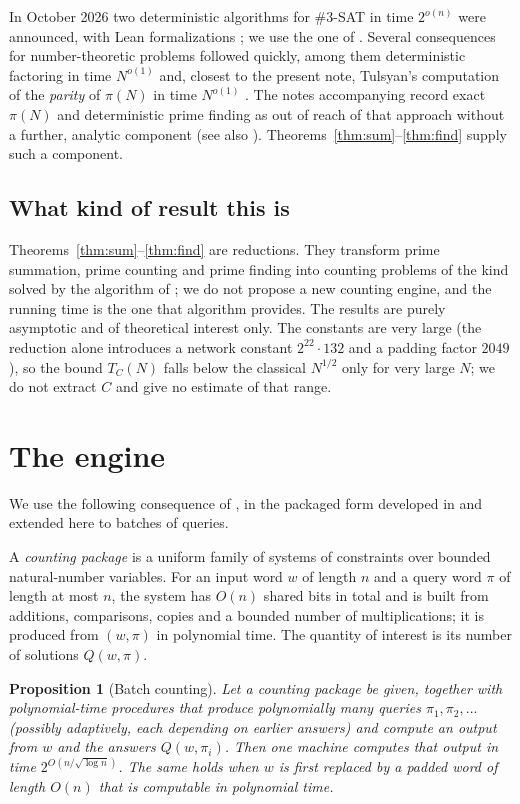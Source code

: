 \documentclass[11pt]{amsart}
\newtheorem{proposition}[theorem]{Proposition}
\theoremstyle{remark}
\begin{document}
In October 2026 two deterministic algorithms for \#3-SAT in time $2^{o(n)}$
were announced, with Lean formalizations \cite{O,A}; we use the one of
\cite{A}.
Several consequences for number-theoretic problems followed quickly, among
them deterministic factoring in time $N^{o(1)}$ \cite{RR} and, closest to the
present note, Tulsyan's computation of the \emph{parity} of $\pi(N)$ in time
$N^{o(1)}$ \cite{T1}.  The notes accompanying \cite{T1} record exact
$\pi(N)$ and deterministic prime finding as out of reach of that approach
without a further, analytic component (see also \cite{T2}).
Theorems~\ref{thm:sum}--\ref{thm:find} supply such a component. 

\subsection*{What kind of result this is}
Theorems~\ref{thm:sum}--\ref{thm:find} are reductions.  They transform prime
summation, prime counting and prime finding into counting problems of the
kind solved by the algorithm of \cite{A}; we do not propose a new counting
engine, and the running time is the one that algorithm provides.  The
results are purely asymptotic and of theoretical interest only.  The
constants are very large (the reduction alone introduces a network constant
$2^{22}\cdot132$ and a padding factor $2049$), so the bound $T_C(N)$ falls
below the classical $N^{1/2}$ only for very large $N$; we do not extract $C$
and give no estimate of that range.

\section{The engine}

We use the following consequence of \cite{A}, in the packaged form developed
in \cite{T1} and extended here to batches of queries.

A \emph{counting package} is a uniform family of systems of constraints over
bounded natural-number variables.  For an input word $w$ of length $n$ and a
query word $\pi$ of length at most $n$, the system has $O(n)$ shared bits in
total and is built from additions, comparisons, copies and a bounded number
of multiplications; it is produced from $(w,\pi)$ in polynomial time.  The
quantity of interest is its number of solutions $Q(w,\pi)$.

\begin{proposition}[Batch counting]\label{prop:engine}
Let a counting package be given, together with polynomial-time procedures
that produce polynomially many queries $\pi_1,\pi_2,\dots$ (possibly
adaptively, each depending on earlier answers) and compute an output from
$w$ and the answers $Q(w,\pi_i)$.  Then one machine computes that output in
time $2^{O(n/\sqrt{\log n})}$.  The same holds when $w$ is first replaced by
a padded word of length $O(n)$ that is computable in polynomial time.
\end{proposition}
\end{document}
